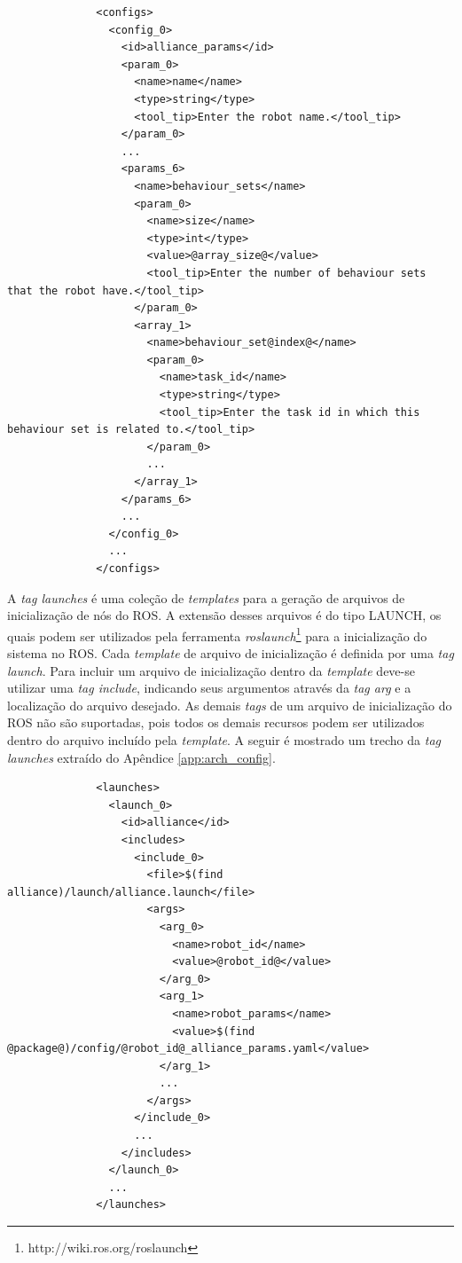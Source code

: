             \begin{lstlisting}
              <configs>
                <config_0>
                  <id>alliance_params</id>
                  <param_0>
                    <name>name</name>
                    <type>string</type>
                    <tool_tip>Enter the robot name.</tool_tip>
                  </param_0>
                  ...
                  <params_6>
                    <name>behaviour_sets</name>
                    <param_0>
                      <name>size</name>
                      <type>int</type>
                      <value>@array_size@</value>
                      <tool_tip>Enter the number of behaviour sets that the robot have.</tool_tip>
                    </param_0>
                    <array_1>
                      <name>behaviour_set@index@</name>
                      <param_0>
                        <name>task_id</name>
                        <type>string</type>
                        <tool_tip>Enter the task id in which this behaviour set is related to.</tool_tip>
                      </param_0>
                      ...
                    </array_1>
                  </params_6>
                  ...
                </config_0>
                ...
              </configs>
            \end{lstlisting}
            
            A \textit{tag launches} é uma coleção de \textit{templates} para a geração de arquivos de inicialização de nós do ROS. A extensão desses arquivos é do tipo LAUNCH, os quais podem ser utilizados pela ferramenta \textit{roslaunch}\footnote{http://wiki.ros.org/roslaunch} para a inicialização do sistema no ROS. Cada \textit{template} de arquivo de inicialização é definida por uma \textit{tag launch}. Para incluir um arquivo de inicialização dentro da \textit{template} deve-se utilizar uma \textit{tag include}, indicando seus argumentos através da \textit{tag arg} e a localização do arquivo desejado. As demais \textit{tags} de um arquivo de inicialização do ROS não são suportadas, pois todos os demais recursos podem ser utilizados dentro do arquivo incluído pela \textit{template}. A seguir é mostrado um trecho da \textit{tag launches} extraído do Apêndice \ref{app:arch_config}.
            
            \begin{lstlisting}
              <launches>
                <launch_0>
                  <id>alliance</id>
                  <includes>
                    <include_0>
                      <file>$(find alliance)/launch/alliance.launch</file>
                      <args>
                        <arg_0>
                          <name>robot_id</name>
                          <value>@robot_id@</value>
                        </arg_0>
                        <arg_1>
                          <name>robot_params</name>
                          <value>$(find @package@)/config/@robot_id@_alliance_params.yaml</value>
                        </arg_1>
                        ...
                      </args>
                    </include_0>
                    ...
                  </includes>
                </launch_0>
                ...
              </launches>
            \end{lstlisting}
            
